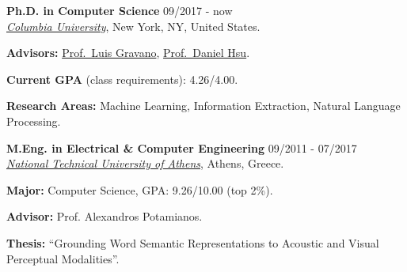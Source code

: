 \documentclass[letterpaper]{article}
\renewenvironment{itemize}{
  \begin{list}{}{
    \setlength{\leftmargin}{1.5em}
  }
}{
  \end{list}
}
\begin{document}
\begin{itemize}
  \item
    \textbf{Ph.D. in Computer Science} \hfill 09/2017 - now\\
    \href{https://www.cs.columbia.edu/}{\it Columbia University}, New York, NY, United States.
     \begin{itemize}
         \item[-]     
         \textbf{Advisors:} \href{http://www.cs.columbia.edu/~gravano/}{Prof.~Luis Gravano}, \href{http://www.cs.columbia.edu/~djhsu/}{Prof.~Daniel Hsu}.
         \item[-] 
            \textbf{Current GPA} (class requirements): 4.26/4.00.
        \item[-] \textbf{Research Areas:} Machine Learning, Information Extraction, Natural Language Processing.
     \end{itemize}
     

  \item
    \textbf{M.Eng. in Electrical \& Computer Engineering} \hfill 09/2011 - 07/2017\\
    \href{http://ece.ntua.gr/}{\it National Technical University of Athens}, Athens, Greece.
    \begin{itemize}
        \item[-] \textbf{Major:} Computer Science, GPA: 9.26/10.00 (top 2\%).
        \item[-] \textbf{Advisor:} Prof. Alexandros Potamianos.
        \item[-] \textbf{Thesis:} ``Grounding Word Semantic Representations to Acoustic and Visual Perceptual Modalities''.
    \end{itemize}



\end{itemize}
\end{document}
